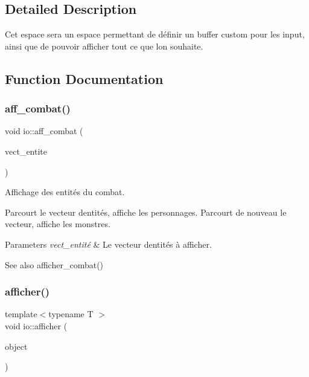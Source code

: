 \subsection{Detailed Description}
Cet espace sera un espace permettant de définir un buffer custom pour les input, ainsi que de pouvoir afficher tout ce que l\textquotesingle{}on souhaite. 

\subsection{Function Documentation}
\mbox{\label{namespaceio_aea8dfd5fea1f29722c77b31ef7b0b940}} 
\subsubsection{\texorpdfstring{aff\+\_\+combat()}{aff\_combat()}}
{\footnotesize\ttfamily void io\+::aff\+\_\+combat (\begin{DoxyParamCaption}\item[{std\+::vector$<$ \hyperlink{classentite}{entite} $>$}]{vect\+\_\+entite }\end{DoxyParamCaption})}



Affichage des entités du combat. 

Parcourt le vecteur d\textquotesingle{}entités, affiche les personnages. Parcourt de nouveau le vecteur, affiche les monstres. 
\begin{DoxyParams}{Parameters}
{\em vect\+\_\+entité} & Le vecteur d\textquotesingle{}entités à afficher. \\
\hline
\end{DoxyParams}
\begin{DoxySeeAlso}{See also}
afficher\+\_\+combat() 
\end{DoxySeeAlso}
\mbox{\label{namespaceio_ac5222293c3d12f7982a8df7ead04ba0b}} 
\subsubsection{\texorpdfstring{afficher()}{afficher()}}
{\footnotesize\ttfamily template$<$typename T $>$ \\
void io\+::afficher (\begin{DoxyParamCaption}\item[{T}]{object }\end{DoxyParamCaption})}



